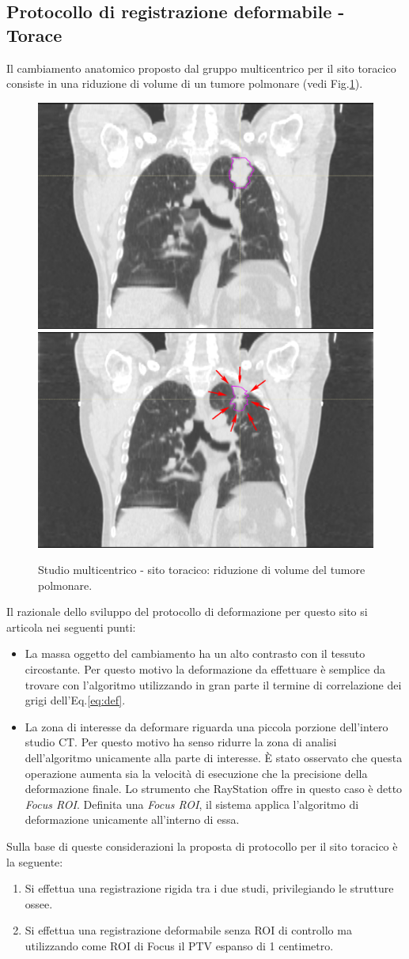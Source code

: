 \subsection{Protocollo di registrazione deformabile - Torace}
Il cambiamento anatomico proposto dal gruppo multicentrico per il sito toracico consiste in una riduzione di volume di un tumore polmonare (vedi Fig.\ref{fig:YES_thorax}). 
\begin{figure}
\centering
\includegraphics[width=.48\textwidth]{./cap3/YES_Thorax.png}
\includegraphics[width=.48\textwidth]{./cap3/YES_Thorax_shrink.png}
\caption{Studio multicentrico - sito toracico: riduzione di volume del tumore polmonare.}
\label{fig:YES_thorax}
\end{figure}
Il razionale dello sviluppo del protocollo di deformazione per questo sito si articola nei seguenti punti:
\begin{itemize}
\item La massa oggetto del cambiamento ha un alto contrasto con il tessuto circostante. Per questo motivo la deformazione da effettuare è semplice da trovare con l'algoritmo utilizzando in gran parte il termine di correlazione dei grigi dell'Eq.\eqref{eq:def}.
\item La zona di interesse da deformare riguarda una piccola porzione dell'intero studio CT. Per questo motivo ha senso ridurre la zona di analisi dell'algoritmo unicamente alla parte di interesse. \`E stato osservato che questa operazione aumenta sia la velocità di esecuzione che la precisione della deformazione finale. Lo strumento che RayStation offre in questo caso è detto \textit{Focus ROI}. Definita una \textit{Focus ROI}, il sistema applica l'algoritmo di deformazione unicamente all'interno di essa. 
\end{itemize}
Sulla base di queste considerazioni la proposta di protocollo per il sito toracico è la seguente:
\begin{enumerate}
\item Si effettua una registrazione rigida tra i due studi, privilegiando le strutture ossee.
\item Si effettua una registrazione deformabile senza ROI di controllo ma utilizzando come ROI di Focus il PTV espanso di 1 centimetro.
\end{enumerate}


